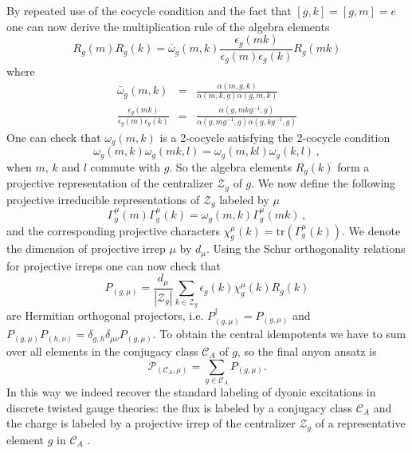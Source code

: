 \documentclass[12 pt]{article}
\begin{document}
By repeated use of the cocycle condition and the fact that $[g,k]=[g,m]=e$ one can now derive the multiplication rule of the algebra elements
\begin{equation} \label{groupmultiplication}
    R_g(m)R_g(k) =  \bar{\omega}_g(m,k) \frac{\epsilon_g(mk)}{\epsilon_g(m)\epsilon_g(k)}R_g(mk)
\end{equation}
where
\begin{eqnarray}
    \bar{\omega}_g(m,k) &  = &  \frac{\alpha(m,g,k)}{\alpha(m,k,g)\alpha(g,m,k)} \nonumber \\
    \frac{\epsilon_g(mk)}{\epsilon_g(m)\epsilon_g(k)} & = & \frac{\alpha(g,mkg^{-1},g)}{\alpha(g,mg^{-1},g)\alpha(g,kg^{-1},g)}
\end{eqnarray}
One can check that $\omega_g(m,k)$ is a 2-cocycle satisfying the 2-cocycle condition
\begin{equation}
    \omega_g(m,k)\omega_g(mk,l) = \omega_g(m,kl)\omega_g(k,l)\, ,
\end{equation}
when $m$, $k$ and $l$ commute with $g$. So the algebra elements $R_g(k)$ form a projective representation of the centralizer $\mathcal{Z}_g$ of $g$. We now define the following projective irreducible representations of $\mathcal{Z}_g$ labeled by $\mu$
\begin{equation}
    \Gamma^\mu_g(m) \Gamma^\mu_g(k) = \omega_g(m,k) \Gamma_g^\mu(mk)\, ,
\end{equation}
and the corresponding projective characters $\chi^\mu_g(k) = \text{tr}(\Gamma^\mu_g(k))$. We denote the dimension of projective irrep $\mu$ by $d_\mu$. Using the Schur orthogonality relations for projective irreps one can now check that
\begin{equation}
    P_{(g,\mu)} = \frac{d_\mu}{|\mathcal{Z}_g|}\sum_{k\in\mathcal{Z}_g} \epsilon_g(k) \chi^\mu_g(k)R_g(k)
\end{equation}
are Hermitian orthogonal projectors, i.e. $P_{(g,\mu)}^\dagger =  P_{(g,\mu)}$ and $P_{(g,\mu)}P_{(h,\nu)} = \delta_{g,h}\delta_{\mu\nu} P_{(g,\mu)}$. To obtain the central idempotents we have to sum over all elements in the conjugacy class $\mathcal{C}_A$ of $g$, so the final anyon ansatz is
\begin{equation}
    \mathcal{P}_{(\mathcal{C}_A,\mu)} = \sum_{g\in \mathcal{C}_A} P_{(g,\mu)}.
\end{equation}
In this way we indeed recover the standard labeling of dyonic excitations in discrete twisted gauge theories: the flux is labeled by a conjugacy class $\mathcal{C}_A$ and the charge is labeled by a projective irrep of the centralizer $\mathcal{Z}_g$ of a representative element $g$ in $\mathcal{C}_A$ \cite{orbifold,DijkgraafPasquierRoche}.
\end{document}
